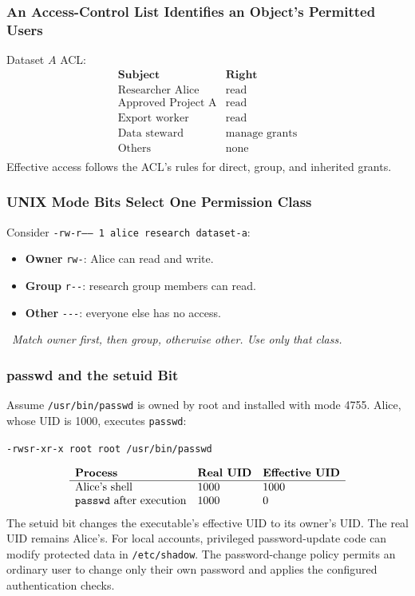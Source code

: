 \documentclass[hidelinks]{article}
\newcommand{\callout}[1]{\par\smallskip\noindent{\color{capri}$\blacktriangleright$}\ \textit{#1}\par\smallskip}
\begin{document}
\subsubsection{An Access-Control List Identifies an Object's Permitted Users}

Dataset $A$ ACL:
\[
\begin{array}{ll}
\textbf{Subject} & \textbf{Right}\\ \hline
\text{Researcher Alice}   & \text{read}\\
\text{Approved Project A} & \text{read}\\
\text{Export worker}      & \text{read}\\
\text{Data steward}       & \text{manage grants}\\
\text{Others}             & \text{none}\\
\end{array}
\]
Effective access follows the ACL's rules for direct, group, and inherited grants.

\subsubsection{UNIX Mode Bits Select One Permission Class}

Consider \texttt{-rw-r----- 1 alice research dataset-a}:
\begin{itemize}
    \item \textbf{Owner} \texttt{rw-}: Alice can read and write.
    \item \textbf{Group} \texttt{r-\/-}: research group members can read.
    \item \textbf{Other} \texttt{-\/-\/-}: everyone else has no access.
\end{itemize}

\callout{Match owner first, then group, otherwise other. Use only that class.}

\subsubsection{passwd and the setuid Bit}

Assume \texttt{/usr/bin/passwd} is owned by root and installed with mode 4755. Alice, whose UID is 1000, executes \texttt{passwd}:
\begin{center}
\texttt{-rwsr-xr-x root root /usr/bin/passwd}
\end{center}
\[
\begin{array}{lll}
\textbf{Process} & \textbf{Real UID} & \textbf{Effective UID}\\ \hline
\text{Alice's shell} & 1000 & 1000\\
\text{\texttt{passwd} after execution} & 1000 & 0\\
\end{array}
\]
The setuid bit changes the executable's effective UID to its owner's UID. The real UID remains Alice's. For local accounts, privileged password-update code can modify protected data in \texttt{/etc/shadow}. The password-change policy permits an ordinary user to change only their own password and applies the configured authentication checks.
\end{document}
